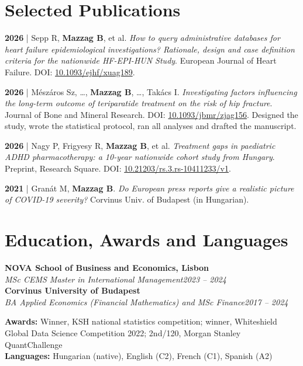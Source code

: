 \documentclass[a4paper,10pt]{article}
\newcommand{\heading}[2]{
  \hspace{10pt}#1\hfill#2\\
}
\newcommand{\headingBf}[2]{
  \heading{\textbf{#1}}{\textbf{#2}}
}
\newcommand{\headingIt}[2]{
  \heading{\textit{#1}}{\textit{#2}}
}
\newenvironment{resume_list}{
  \vspace{-7pt}
  \begin{itemize}[itemsep=-2px, parsep=1pt, leftmargin=30pt]
}{
  \end{itemize}
}
\begin{document}
  \section{Selected Publications}
  \begin{resume_list}
    \item \textbf{2026} | Sepp R, \textbf{Mazzag B}, et al. \textit{How to query administrative databases for heart failure epidemiological investigations? Rationale, design and case definition criteria for the nationwide HF-EPI-HUN Study}. European Journal of Heart Failure. DOI: \href{https://doi.org/10.1093/ejhf/xuag189}{10.1093/ejhf/xuag189}.
    \item \textbf{2026} | Mészáros Sz, \dots, \textbf{Mazzag B}, \dots, Takács I. \textit{Investigating factors influencing the long-term outcome of teriparatide treatment on the risk of hip fracture}. Journal of Bone and Mineral Research. DOI: \href{https://doi.org/10.1093/jbmr/zjag156}{10.1093/jbmr/zjag156}. Designed the study, wrote the statistical protocol, ran all analyses and drafted the manuscript.
    \item \textbf{2026} | Nagy P, Frigyesy R, \textbf{Mazzag B}, et al. \textit{Treatment gaps in paediatric ADHD pharmacotherapy: a 10-year nationwide cohort study from Hungary}. Preprint, Research Square. DOI: \href{https://doi.org/10.21203/rs.3.rs-10411233/v1}{10.21203/rs.3.rs-10411233/v1}.
    \item \textbf{2021} | Granát M, \textbf{Mazzag B}. \textit{Do European press reports give a realistic picture of COVID-19 severity?} Corvinus Univ. of Budapest (in Hungarian).
  \end{resume_list}


  \section{Education, Awards and Languages}

  \headingBf{NOVA School of Business and Economics, Lisbon}{}
  \headingIt{MSc CEMS Master in International Management}{2023 -- 2024}
  \headingBf{Corvinus University of Budapest}{}
  \headingIt{BA Applied Economics (Financial Mathematics) and MSc Finance}{2017 -- 2024}
  \vspace{0.5\baselineskip}
  \heading{\textbf{Awards:} Winner, KSH national statistics competition; winner, Whiteshield Global Data Science Competition 2022; 2nd/120, Morgan Stanley QuantChallenge}{}
  \heading{\textbf{Languages:} Hungarian (native), English (C2), French (C1), Spanish (A2)}{}
\end{document}
